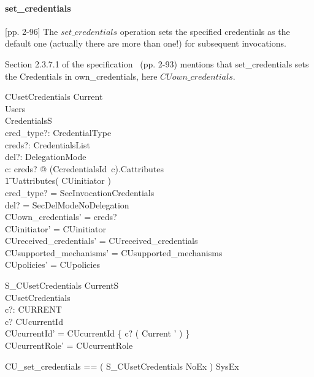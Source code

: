 \paragraph{set\_credentials}
[pp. 2-96] The $set\_credentials$ operation sets the specified credentials as
the default one (actually there are more than one!) for subsequent invocations.

Section 2.3.7.1 of the \corbasec{} specification~\cite{omg:Security:1.5:2000}
(pp. 2-93) mentions that set\_credentials sets the Credentials in
own\_credentials, here $CUown\_credentials$.

\begin{schema}{CUsetCredentials}
  \Delta Current \\
  \Xi Users \\
  \Xi CredentialsS \\
  cred\_type?: CredentialType \\
  creds?: CredentialsList \\
  del?: DelegationMode \\
  \where
  \forall c: \ran creds? @ (CcredentialsId~c).Cattributes \subseteq \\
  \t1 Uattributes( CUinitiator ) \\

  cred\_type? = SecInvocationCredentials \\
  del? = SecDelModeNoDelegation \\

  CUown\_credentials' = creds? \\
  CUinitiator' = CUinitiator \\
  CUreceived\_credentials' = CUreceived\_credentials \\
  CUsupported\_mechanisms' = CUsupported\_mechanisms \\
  CUpolicies' = CUpolicies\\ 
\end{schema}
\begin{schema}{S\_CUsetCredentials}
  \Delta CurrentS \\
  CUsetCredentials \\
  c?: CURRENT \\
  \where
  c? \in \dom CUcurrentId \\ 

  CUcurrentId' = CUcurrentId \oplus \{ c? \mapsto ( \theta Current ' ) \} \\ 
  CUcurrentRole' = CUcurrentRole \\
\end{schema}
\begin{zed}
  CU\_set\_credentials == ( S\_CUsetCredentials \land NoEx ) \lor SysEx
\end{zed}


